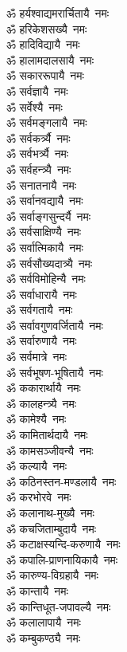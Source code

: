 \begin{multicols}{2}
\begin{flushleft}
ॐ हर्यश्वाद्यमरार्चितायै~नमः\\
ॐ हरिकेशसख्यै~नमः\\
ॐ हादिविद्यायै~नमः\\
ॐ हालामदालसायै~नमः\hfill {}\\
ॐ सकाररूपायै~नमः\\
ॐ सर्वज्ञायै~नमः\\
ॐ सर्वेश्यै~नमः\\
ॐ सर्वमङ्गलायै~नमः\\
ॐ सर्वकर्त्र्यै~नमः\\
ॐ सर्वभर्त्र्यै~नमः\\
ॐ सर्वहन्त्र्यै~नमः\\
ॐ सनातनायै~नमः\\
ॐ सर्वानवद्यायै~नमः\\
ॐ सर्वाङ्गसुन्दर्यै~नमः\hfill {}\\
ॐ सर्वसाक्षिण्यै~नमः\\
ॐ सर्वात्मिकायै~नमः\\
ॐ सर्वसौख्यदात्र्यै~नमः\\
ॐ सर्वविमोहिन्यै~नमः\\
ॐ सर्वाधारायै~नमः\\
ॐ सर्वगतायै~नमः\\
ॐ सर्वावगुणवर्जितायै~नमः\\
ॐ सर्वारुणायै~नमः\\
ॐ सर्वमात्रे~नमः\\
ॐ सर्वभूषण-भूषितायै~नमः\hfill {}\\
ॐ ककारार्थायै~नमः\\
ॐ कालहन्त्र्यै~नमः\\
ॐ कामेश्यै~नमः\\
ॐ कामितार्थदायै~नमः\\
ॐ कामसञ्जीवन्यै~नमः\\
ॐ कल्यायै~नमः\\
ॐ कठिनस्तन-मण्डलायै~नमः\\
ॐ करभोरवे~नमः\\
ॐ कलानाथ-मुख्यै~नमः\\
ॐ कचजिताम्बुदायै~नमः\hfill {}\\
ॐ कटाक्षस्यन्दि-करुणायै~नमः\\
ॐ कपालि-प्राणनायिकायै~नमः\\
ॐ कारुण्य-विग्रहायै~नमः\\
ॐ कान्तायै~नमः\\
ॐ कान्तिधूत-जपावल्यै~नमः\\
ॐ कलालापायै~नमः\\
ॐ कम्बुकण्ठ्यै~नमः\\

\end{flushleft}
\end{multicols}
